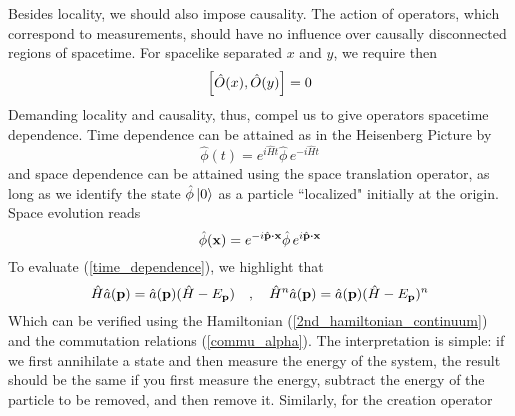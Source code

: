 Besides locality, we should also impose  causality. The action of operators, which correspond to measurements, should have no influence over causally disconnected regions of spacetime. 
For spacelike separated $x$ and $y$, we require then
 \begin{equation}
    \comm{\hat{O}(x)}{\hat{O}(y)}=0
    \label{causality}
 \end{equation}
Demanding locality and causality, thus, compel us to give operators spacetime dependence. Time dependence can be attained as in the Heisenberg Picture by 
\begin{equation}
      \hat{\phi}(t)=e^{i\hat{H}t}      \hat{\phi}\,e^{-i\hat{H}t}
      \label{time_dependence}
\end{equation}
and space dependence can be attained using the space translation operator, as long as we identify the state $\hat{\phi}\ket{0}$ as a particle ``localized" initially at the origin. Space evolution reads
\begin{equation}
      \hat{\phi}(\vb{x})=e^{-i\hat{\vb{p}}\vdot\vb{x}}      \hat{\phi}\,e^{i\hat{\vb{p}}\vdot\vb{x}}
      \label{space_translation}
\end{equation}
To evaluate (\ref{time_dependence}), we highlight that
\begin{equation}
    \hat{H}\hat{a}(\vb{p})=\hat{a}(\vb{p})(\hat{H}-E_{\vb{p}})\quad,\quad \hat{H}^n\hat{a}(\vb{p})=\hat{a}(\vb{p})(\hat{H}-E_{\vb{p}})^n
\end{equation}
Which can be verified using the Hamiltonian (\ref{2nd_hamiltonian_continuum}) and the commutation relations (\ref{commu_alpha}). The interpretation is simple: if we first annihilate a state and then measure the energy of the system, the result should be the same if you first measure the energy, subtract the energy of the particle to be removed, and then remove it. Similarly, for the creation operator
